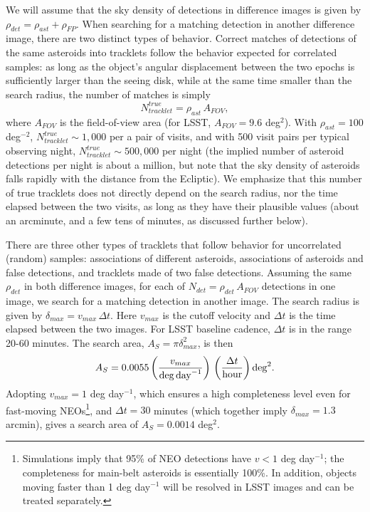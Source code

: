 We will assume that the sky density of detections in difference images is given by 
$\rho_{det} = \rho_{ast} + \rho_{FP}$. When searching for a matching detection in another
difference image, there are two distinct types of behavior. Correct matches of detections
of the same asteroids into tracklets follow the behavior expected for correlated samples:
as long as the object's angular displacement between the two epochs is sufficiently larger 
than the seeing disk, while at the same time smaller than the search radius, the number
of matches is simply 
\begin{equation}
             N_{tracklet}^{true} = \rho_{ast}  \, A_{FOV},
\end{equation}
where $A_{FOV}$ is the field-of-view area (for LSST, $A_{FOV}=9.6$ deg$^2$). With 
$\rho_{ast} = 100$ deg$^{-2}$, $N_{tracklet}^{true} \sim 1,000$ per a pair of visits, and with
500 visit pairs per typical observing night, $N_{tracklet}^{true} \sim 500,000$ per night
(the implied number of asteroid detections per night is about a million, but note that 
the sky density of asteroids falls rapidly with the distance from the Ecliptic). We emphasize 
that this number of true tracklets does not directly depend on the search radius, nor the 
time elapsed between the two visits, as long as they have their plausible values (about an 
arcminute, and a few tens of minutes, as discussed further below). 

There are three other types of tracklets that follow behavior for uncorrelated (random) 
samples: associations of different asteroids, associations of asteroids and false detections, 
and tracklets made of two false detections. Assuming the same $\rho_{det}$ in both 
difference images, for each of $N_{det} = \rho_{det} \, A_{FOV}$ detections in one image,
we search for a matching detection in another image. The search radius is given by 
$\delta_{max} = v_{max} \, \Delta t$. Here $v_{max}$ is the  cutoff velocity and $\Delta t$ 
is the time elapsed between the two images. For LSST baseline cadence, $\Delta t$ is in 
the range 20-60 minutes. The search area, $A_S = \pi \delta_{max}^2$, is then 
\begin{equation}
     A_S = 0.0055 \left( v_{max}  \over {\rm deg \, day}^{-1} \right) \, \left(\Delta t \over {\rm hour} \right) {\rm deg}^2.
\end{equation}
Adopting $v_{max} = 1$ deg day$^{-1}$, which ensures a high completeness level even for fast-moving 
NEOs\footnote{Simulations imply that 95\% of NEO detections have $v<1$ deg day$^{-1}$; the completeness
for main-belt asteroids is essentially 100\%. In addition, objects moving faster than 1 deg day$^{-1}$ will
be resolved in LSST images and can be treated separately.}, and $\Delta t = 30$ minutes (which together 
imply $\delta_{max} = 1.3$ arcmin), gives a search area of $A_S = 0.0014$ deg$^2$. 

